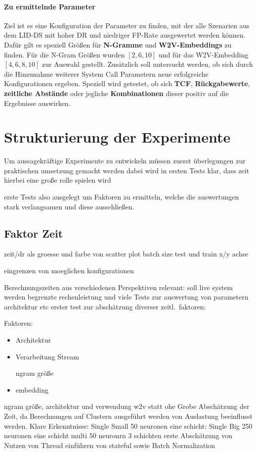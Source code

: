             \paragraph{Zu ermittelnde Parameter}
            Ziel ist es eine Konfiguration der Parameter zu finden, mit der alle Szenarien aus dem \ac{LID-DS} mit hoher \ac{DR} und niedriger \ac{FP}-Rate ausgewertet werden können.
            Dafür gilt es speziell Größen für \textbf{N-Gramme} und \textbf{\ac{W2V}-Embeddings} zu finden.
            Für die N-Gram Größen wurden $[2,6,10]$ und für das \ac{W2V}-Embedding $[4,6,8,10]$ zur Auswahl gestellt.
            Zusätzlich soll untersucht werden, ob sich durch die Hinzunahme weiterer System Call Parametern neue erfolgreiche Konfigurationen ergeben.
            Speziell wird getestet, ob sich \textbf{\ac{TCF}}, \textbf{Rückgabewerte}, \textbf{zeitliche Abstände} oder jegliche \textbf{Kombinationen} dieser positiv auf die Ergebnisse auswirken.
                
\iffalse
    \section{Strukturierung der Experimente}\label{sec:StrukExp}
        Um aussagekräftige Experimente zu entwickeln müssen zuerst 
        überlegungen zur praktischen umsetzung gemacht werden
        dabei wird in ersten Tests klar, dass zeit hierbei eine große rolle spielen wird

        erste Tests also ausgelegt um Faktoren zu ermitteln, welche die auswertungen stark verlangsamen
        und diese ausschließen.

        \subsection{Faktor Zeit}
            zeit/dr als groesse und farbe von scatter plot
            batch size test und train x/y achse

            eingrenzen von moeglichen konfigurationen

            Berechnungszeiten aus verschiedenen Perspektiven relevant:
            soll live system werden
            begrenzte rechenleistung und viele Tests zur auswertung von parametern architektur etc
            erster test zur abschätzung diverser zeitl.\ faktoren:

            Faktoren:
            \begin{itemize}
                \item Architektur
                \item Verarbeitung Stream

                     ngram größe
                \item embedding
            \end{itemize}
            ngram größe, architektur und verwendung w2v statt ohe
            Grobe Abschätzung der Zeit, da Berechnungen auf Clustern ausgeführt werden von Auslastung beeinflusst werden.
            Klare Erkenntnisse:
            Single Small 50 neuronen eine schicht:
            Single Big 250 neuronen eine schicht
            multi 50 neuronrn 3 schichten
            erste Abschätzung von Nutzen von Thread 
            einführen von stateful sowie Batch Normalization
